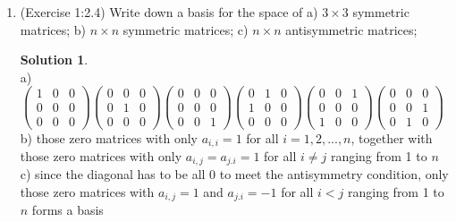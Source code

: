 \documentclass[]{book}
\theoremstyle{definition}
\newtheorem*{soln}{Solution}
\newcommand{\0}{\mathbf{0}}
\begin{document}
\begin{enumerate}
\item (Exercise 1:2.4)
Write down a basis for the space of \newline
a) $3\times 3$ symmetric matrices; \newline
b) $n \times n$ symmetric matrices; \newline
c) $n \times n$ antisymmetric matrices;
\begin{soln}~\\
\newline
a)$\begin{pmatrix}
1 & 0 & 0\\
0 & 0 & 0 \\
0 & 0 & 0
\end{pmatrix}\begin{pmatrix}
0 & 0 & 0\\
0 & 1 & 0 \\
0 & 0 & 0
\end{pmatrix}\begin{pmatrix}
0 & 0 & 0\\
0 & 0 & 0 \\
0 & 0 & 1
\end{pmatrix}\begin{pmatrix}
0 & 1 & 0\\
1 & 0 & 0 \\
0 & 0 & 0
\end{pmatrix}\begin{pmatrix}
0 & 0 & 1\\
0 & 0 & 0 \\
1 & 0 & 0
\end{pmatrix}\begin{pmatrix}
0 & 0 & 0\\
0 & 0 & 1 \\
0 & 1 & 0
\end{pmatrix}$ \newline
\newline
b) those zero matrices with only $a_{i,i}=1$ for all $i=1,2,...,n$, together with those zero matrices with only $a_{i,j}=a_{j.i}=1$ for all $i\neq j$ ranging from 1 to $n$ \newline
c) since the diagonal has to be all 0 to meet the antisymmetry condition, only those zero matrices with $a_{i,j}=1$ and $a_{j.i}=-1$ for all $i< j$ ranging from 1 to $n$ forms a basis
\end{soln}


\end{enumerate}
\end{document}
